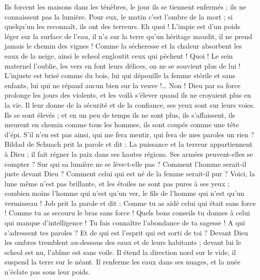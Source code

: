 \begin{multicols}{2}
Ils forcent les maisons dans les ténèbres, le jour ils se tiennent enfermés ; ils ne connaissent pas la lumière.
Pour eux, le matin c'est l'ombre de la mort ; si quelqu'un les reconnaît, ils ont des terreurs.
Eh quoi ! L'impie est d'un poids léger sur la surface de l'eau, il n'a sur la terre qu'un héritage maudit, il ne prend jamais le chemin des vignes !
Comme la sécheresse et la chaleur absorbent les eaux de la neige, ainsi le scheol engloutit ceux qui pèchent !
Quoi ! Le sein maternel l'oublie, les vers en font leurs délices, on ne se souvient plus de lui ! L'injuste est brisé comme du bois,
lui qui dépouille la femme stérile et sans enfants, lui qui ne répand aucun bien sur la veuve !…
Non ! Dieu par sa force prolonge les jours des violents, et les voilà s'élever quand ils ne croyaient plus en la vie.
Il leur donne de la sécurité et de la confiance, ses yeux sont sur leurs voies.
Ils se sont élevés ; et en un peu de temps ils ne sont plus, ils s'affaissent, ils meurent en chemin comme tous les hommes, ils sont coupés comme une tête d'épi.
S'il n'en est pas ainsi, qui me fera mentir, qui fera de mes paroles un rien ?
\VerseOne{}Bildad de Schuach prit la parole et dit :
La puissance et la terreur appartiennent à Dieu ; il fait régner la paix dans ses hautes régions.
Ses armées peuvent-elles se compter ? Sur qui sa lumière ne se lève-t-elle pas ?
Comment l'homme serait-il juste devant Dieu ? Comment celui qui est né de la femme serait-il pur ?
Voici, la lune même n'est pas brillante, et les étoiles ne sont pas pures à ses yeux ;
combien moins l'homme qui n'est qu'un ver, le fils de l'homme qui n'est qu'un vermisseau !
\VerseOne{}Job prit la parole et dit :
Comme tu as aidé celui qui était sans force ! Comme tu as secouru le bras sans force !
Quels bons conseils tu donnes à celui qui manque d'intelligence ! Tu fais connaître l'abondance de ta sagesse !
A qui s'adressent tes paroles ? Et de qui est l'esprit qui est sorti de toi ?
Devant Dieu les ombres tremblent au-dessous des eaux et de leurs habitants ;
devant lui le scheol est nu, l'abîme est sans voile.
Il étend la direction nord sur le vide, il suspend la terre sur le néant.
Il renferme les eaux dans ses nuages, et la nuée n'éclate pas sous leur poids.

\end{multicols}
